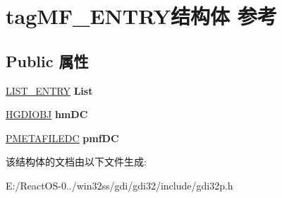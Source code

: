 \hypertarget{structtag_m_f___e_n_t_r_y}{}\section{tag\+M\+F\+\_\+\+E\+N\+T\+R\+Y结构体 参考}
\label{structtag_m_f___e_n_t_r_y}
\subsection*{Public 属性}
\begin{DoxyCompactItemize}
\item 
\mbox{\label{structtag_m_f___e_n_t_r_y_a94cc016bac1f4f705c33e347e19de282}} 
\hyperlink{struct___l_i_s_t___e_n_t_r_y}{L\+I\+S\+T\+\_\+\+E\+N\+T\+RY} {\bfseries List}
\item 
\mbox{\label{structtag_m_f___e_n_t_r_y_ad4031cc689d14039748774850ccff48e}} 
\hyperlink{interfacevoid}{H\+G\+D\+I\+O\+BJ} {\bfseries hm\+DC}
\item 
\mbox{\label{structtag_m_f___e_n_t_r_y_a22dc7f6dd0a56aaf951e9797b5e2793f}} 
\hyperlink{structtag_m_e_t_a_f_i_l_e_d_c}{P\+M\+E\+T\+A\+F\+I\+L\+E\+DC} {\bfseries pmf\+DC}
\end{DoxyCompactItemize}


该结构体的文档由以下文件生成\+:\begin{DoxyCompactItemize}
\item 
E\+:/\+React\+O\+S-\/0../win32ss/gdi/gdi32/include/gdi32p.\+h\end{DoxyCompactItemize}
